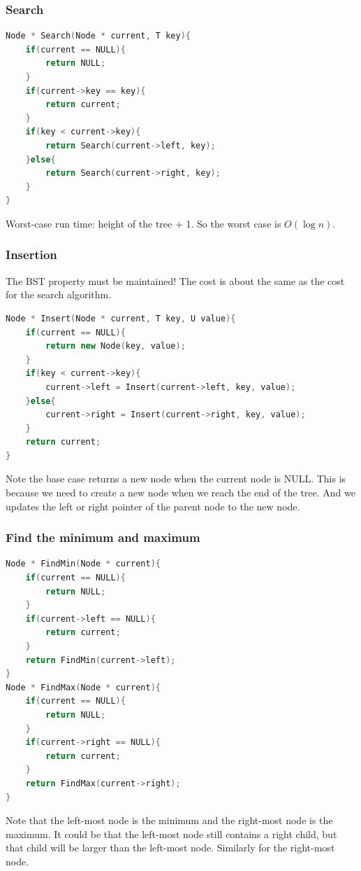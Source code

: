 \documentclass[letterpaper,12pt]{article}
\begin{document}
\subsubsection{Search}
\begin{lstlisting}[language=C++]
Node * Search(Node * current, T key){
    if(current == NULL){
        return NULL;
    }
    if(current->key == key){
        return current;
    }
    if(key < current->key){
        return Search(current->left, key);
    }else{
        return Search(current->right, key);
    }
}
\end{lstlisting}
Worst-case run time: height of the tree + 1. So the worst case is $O(\log n)$.
\subsubsection{Insertion}
The BST property must be maintained! The cost is about the same as the cost for the search algorithm.
\begin{lstlisting}[language=C++]
Node * Insert(Node * current, T key, U value){
    if(current == NULL){
        return new Node(key, value);
    }
    if(key < current->key){
        current->left = Insert(current->left, key, value);
    }else{
        current->right = Insert(current->right, key, value);
    }
    return current;
}
\end{lstlisting}
Note the base case returns a new node when the current node is NULL. This is because we need to create a new node when we reach the end of the tree. And we updates the left or right pointer of the parent node to the new node.

\subsubsection{Find the minimum and maximum}
\begin{lstlisting}[language=C++]
Node * FindMin(Node * current){
    if(current == NULL){
        return NULL;
    }
    if(current->left == NULL){
        return current;
    }
    return FindMin(current->left);
}
Node * FindMax(Node * current){
    if(current == NULL){
        return NULL;
    }
    if(current->right == NULL){
        return current;
    }
    return FindMax(current->right);
}
\end{lstlisting}
Note that the left-most node is the minimum and the right-most node is the maximum. It could be that the left-most node still contains a right child, but that child will be larger than the left-most node. Similarly for the right-most node.
\end{document}

